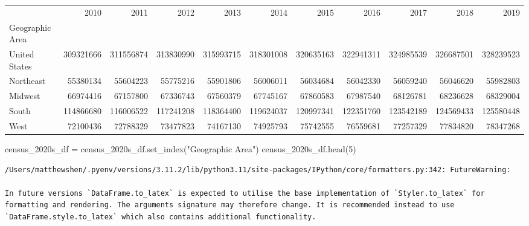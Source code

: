 \documentclass[
  letterpaper,
  DIV=11,
  numbers=noendperiod]{scrreprt}
\newenvironment{Shaded}{\begin{snugshade}}{\end{snugshade}}
\newcommand{\DecValTok}[1]{\textcolor[rgb]{0.68,0.00,0.00}{#1}}
\newcommand{\NormalTok}[1]{\textcolor[rgb]{0.00,0.23,0.31}{#1}}
\newcommand{\OperatorTok}[1]{\textcolor[rgb]{0.37,0.37,0.37}{#1}}
\newcommand{\StringTok}[1]{\textcolor[rgb]{0.13,0.47,0.30}{#1}}
\begin{document}
\begin{tabular}{lrrrrrrrrrr}
\toprule
{} &       2010 &       2011 &       2012 &       2013 &       2014 &       2015 &       2016 &       2017 &       2018 &       2019 \\
Geographic Area &            &            &            &            &            &            &            &            &            &            \\
\midrule
United States   &  309321666 &  311556874 &  313830990 &  315993715 &  318301008 &  320635163 &  322941311 &  324985539 &  326687501 &  328239523 \\
Northeast       &   55380134 &   55604223 &   55775216 &   55901806 &   56006011 &   56034684 &   56042330 &   56059240 &   56046620 &   55982803 \\
Midwest         &   66974416 &   67157800 &   67336743 &   67560379 &   67745167 &   67860583 &   67987540 &   68126781 &   68236628 &   68329004 \\
South           &  114866680 &  116006522 &  117241208 &  118364400 &  119624037 &  120997341 &  122351760 &  123542189 &  124569433 &  125580448 \\
West            &   72100436 &   72788329 &   73477823 &   74167130 &   74925793 &   75742555 &   76559681 &   77257329 &   77834820 &   78347268 \\
\bottomrule
\end{tabular}

\begin{Shaded}
\begin{Highlighting}[]
\NormalTok{census\_2020s\_df }\OperatorTok{=}\NormalTok{ census\_2020s\_df.set\_index(}\StringTok{"Geographic Area"}\NormalTok{)}
\NormalTok{census\_2020s\_df.head(}\DecValTok{5}\NormalTok{)}
\end{Highlighting}
\end{Shaded}

\begin{verbatim}
/Users/matthewshen/.pyenv/versions/3.11.2/lib/python3.11/site-packages/IPython/core/formatters.py:342: FutureWarning:

In future versions `DataFrame.to_latex` is expected to utilise the base implementation of `Styler.to_latex` for formatting and rendering. The arguments signature may therefore change. It is recommended instead to use `DataFrame.style.to_latex` which also contains additional functionality.
\end{verbatim}
\end{document}

